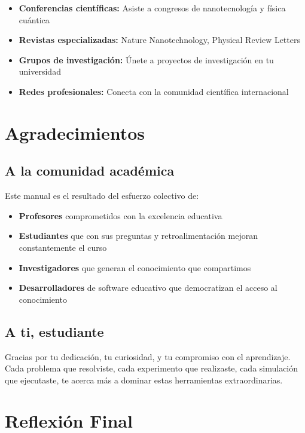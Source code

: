 \begin{tecnologiabox}
\begin{tecnologiabox}
\begin{tecnologiabox}
\begin{teknologiabox}
\begin{itemize}
	\item \textbf{Conferencias científicas:} Asiste a congresos de nanotecnología y física cuántica
	\item \textbf{Revistas especializadas:} Nature Nanotechnology, Physical Review Letters
	\item \textbf{Grupos de investigación:} Únete a proyectos de investigación en tu universidad
	\item \textbf{Redes profesionales:} Conecta con la comunidad científica internacional
\end{itemize}

\section{Agradecimientos}

\subsection{A la comunidad académica}

Este manual es el resultado del esfuerzo colectivo de:

\begin{itemize}
	\item \textbf{Profesores} comprometidos con la excelencia educativa
	\item \textbf{Estudiantes} que con sus preguntas y retroalimentación mejoran constantemente el curso
	\item \textbf{Investigadores} que generan el conocimiento que compartimos
	\item \textbf{Desarrolladores} de software educativo que democratizan el acceso al conocimiento
\end{itemize}

\subsection{A ti, estudiante}

Gracias por tu dedicación, tu curiosidad, y tu compromiso con el aprendizaje. Cada problema que resolviste, cada experimento que realizaste, cada simulación que ejecutaste, te acerca más a dominar estas herramientas extraordinarias.

\section{Reflexión Final}


\end{teknologiabox}
\end{tecnologiabox}
\end{tecnologiabox}
\end{tecnologiabox}
